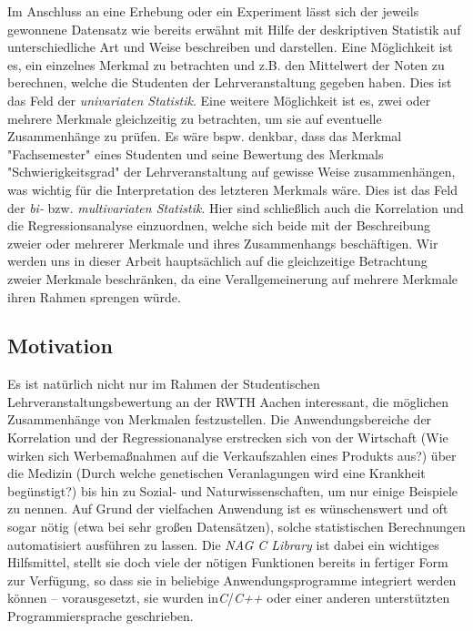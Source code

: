 \documentclass{article}
\begin{document}
Im Anschluss an eine Erhebung oder ein Experiment lässt sich  der jeweils gewonnene Datensatz wie bereits erwähnt mit Hilfe der deskriptiven Statistik auf unterschiedliche Art und Weise beschreiben und darstellen. Eine Möglichkeit ist es, ein einzelnes Merkmal zu betrachten und z.B. den Mittelwert der Noten zu berechnen, welche die Studenten der Lehrveranstaltung gegeben haben. Dies ist das Feld der {\it univariaten Statistik}. Eine weitere Möglichkeit ist es, zwei oder mehrere Merkmale gleichzeitig zu betrachten, um sie auf eventuelle Zusammenhänge zu prüfen. Es wäre bspw. denkbar, dass das Merkmal "Fachsemester" eines Studenten und seine Bewertung des Merkmals "Schwierigkeitsgrad" der Lehrveranstaltung auf gewisse Weise zusammenhängen, was wichtig für die Interpretation des letzteren Merkmals wäre. Dies ist das Feld der {\it bi-} bzw. {\it multivariaten Statistik}. Hier sind schließlich auch die Korrelation und die Regressionsanalyse einzuordnen, welche sich beide mit der Beschreibung zweier oder mehrerer Merkmale und ihres Zusammenhangs beschäftigen. Wir werden uns in dieser Arbeit hauptsächlich auf die gleichzeitige Betrachtung zweier Merkmale beschränken, da eine Verallgemeinerung auf mehrere Merkmale ihren Rahmen sprengen würde.

\subsection{Motivation}

Es ist natürlich nicht nur im Rahmen der Studentischen Lehrveranstaltungsbewertung an der RWTH Aachen interessant, die möglichen Zusammenhänge von Merkmalen festzustellen. Die Anwendungsbereiche der Korrelation und der Regressionanalyse erstrecken sich von der Wirtschaft (Wie wirken sich Werbemaßnahmen auf die Verkaufszahlen eines Produkts aus?) über die Medizin (Durch welche genetischen Veranlagungen wird eine Krankheit begünstigt?) bis hin zu Sozial- und Naturwissenschaften, um nur einige Beispiele zu nennen. Auf Grund der vielfachen Anwendung ist es wünschenswert und oft sogar nötig (etwa bei sehr großen Datensätzen), solche statistischen Berechnungen automatisiert ausführen zu lassen. Die {\it NAG C Library} ist dabei ein wichtiges Hilfsmittel, stellt sie doch viele der nötigen Funktionen bereits in fertiger Form zur Verfügung, so dass sie in beliebige Anwendungsprogramme integriert werden können -- vorausgesetzt, sie wurden in{\it C}/{\it C++} oder einer anderen unterstützten Programmiersprache geschrieben.
\end{document}
